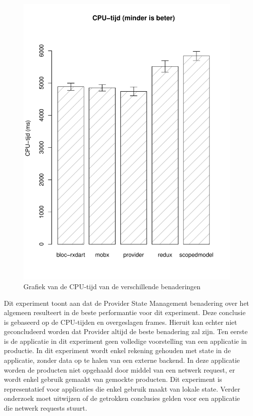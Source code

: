 \begin{figure}[H]
    \centering
    \includegraphics[width=0.8\linewidth]{img/experiment/cpu_time.pdf}
    \caption{Grafiek van de CPU-tijd van de verschillende benaderingen}
    \label{fig:graph-cpu-time}
\end{figure}
Dit experiment toont aan dat de Provider State Management benadering over het algemeen resulteert in de beste performantie voor dit experiment. Deze conclusie is gebaseerd op de CPU-tijden en overgeslagen frames. Hieruit kan echter niet geconcludeerd worden dat Provider altijd de beste benadering zal zijn. \newline \newline
Ten eerste is de applicatie in dit experiment geen volledige voorstelling van een applicatie in productie. In dit experiment wordt enkel rekening gehouden met state in de applicatie, zonder data op te halen van een externe backend. In deze applicatie worden de producten niet opgehaald door middel van een netwerk request, er wordt enkel gebruik gemaakt van gemockte producten. Dit experiment is representatief voor applicaties die enkel gebruik maakt van lokale state. Verder onderzoek moet uitwijzen of de getrokken conclusies gelden voor een applicatie die netwerk requests stuurt. \newline
